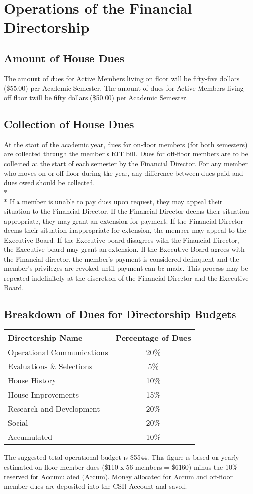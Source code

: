 \documentclass{article}
\newcommand{\bylaw}[1]{\section{#1} \label{#1}}
\newcommand{\bsection}[1]{\subsection{#1} \label{#1}}
\begin{document}
\bylaw{Operations of the Financial Directorship}
\bsection{Amount of House Dues}
The amount of dues for Active Members living on floor will be fifty-five dollars (\$55.00) per Academic Semester. The amount of dues for Active Members living off floor twill be fifty dollars (\$50.00) per Academic Semester.
\bsection{Collection of House Dues}
At the start of the academic year, dues for on-floor members (for both semesters) are collected through the member’s RIT bill. Dues for off-floor members are to be collected at the start of each semester by the Financial Director. For any member who moves on or off-floor during the year, any difference between dues paid and dues owed should be collected.
\\*\\*
If a member is unable to pay dues upon request, they may appeal their situation to the Financial Director. If the Financial Director deems their situation appropriate, they may grant an extension for payment. If the Financial Director deems their situation inappropriate for extension, the member may appeal to the Executive Board. If the Executive board disagrees with the Financial Director, the Executive board may grant an extension. If the Executive Board agrees with the Financial director, the member’s payment is considered delinquent and the member’s privileges are revoked until payment can be made. This process may be repeated indefinitely at the discretion of the Financial Director and the Executive Board.
\bsection{Breakdown of Dues for Directorship Budgets}
\begin{center}
\begin{tabular}[c]{l c}
Directorship Name & Percentage of Dues \\
\hline
\hline
Operational Communications & 20\% \\
\hline
Evaluations \& Selections & 5\% \\
\hline
House History & 10\% \\
\hline
House Improvements & 15\% \\
\hline
Research and Development & 20\% \\
\hline
Social & 20\% \\
\hline
Accumulated & 10\% \\
\hline
\end{tabular}
\end{center}

The suggested total operational budget is \$5544. This figure is based on yearly estimated on-floor member dues (\$110 x 56 members = \$6160) minus the 10\% reserved for Accumulated (Accum). Money allocated for Accum and off-floor member dues are deposited into the CSH Account and saved.
\end{document}
